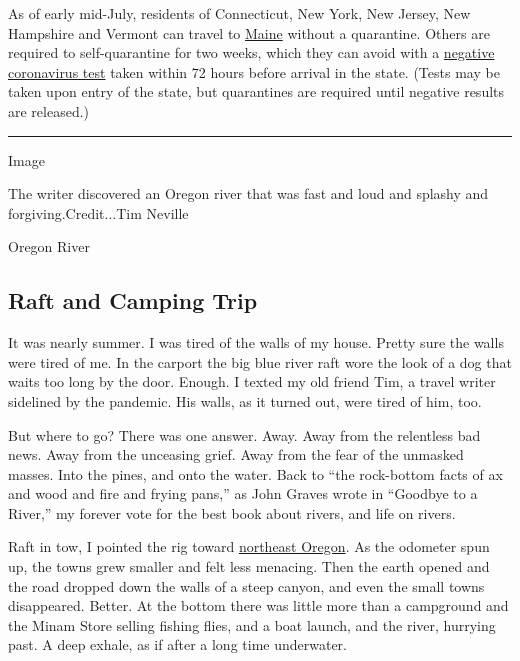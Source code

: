 As of early mid-July, residents of Connecticut, New York, New Jersey,
New Hampshire and Vermont can travel to
\href{https://www.nytimes3xbfgragh.onion/interactive/2020/us/states-reopen-map-coronavirus.html}{Maine}
without a quarantine. Others are required to self-quarantine for two
weeks, which they can avoid with a
\href{https://www.maine.gov/covid19/restartingmaine/keepmainehealthy/faqs}{negative
coronavirus test} taken within 72 hours before arrival in the state.
(Tests may be taken upon entry of the state, but quarantines are
required until negative results are released.)

\begin{center}\rule{0.5\linewidth}{\linethickness}\end{center}

Image

The writer discovered an Oregon river that was fast and loud and splashy
and forgiving.Credit...Tim Neville

Oregon River

\hypertarget{raft-and-camping-trip}{%
\subsection{Raft and Camping Trip}\label{raft-and-camping-trip}}

It was nearly summer. I was tired of the walls of my house. Pretty sure
the walls were tired of me. In the carport the big blue river raft wore
the look of a dog that waits too long by the door. Enough. I texted my
old friend Tim, a travel writer sidelined by the pandemic. His walls, as
it turned out, were tired of him, too.

But where to go? There was one answer. Away. Away from the relentless
bad news. Away from the unceasing grief. Away from the fear of the
unmasked masses. Into the pines, and onto the water. Back to ``the
rock-bottom facts of ax and wood and fire and frying pans,'' as John
Graves wrote in ``Goodbye to a River,'' my forever vote for the best
book about rivers, and life on rivers.

Raft in tow, I pointed the rig toward
\href{http://www.blm.gov/visit/grande-ronde-wild-scenic-river}{northeast
Oregon}. As the odometer spun up, the towns grew smaller and felt less
menacing. Then the earth opened and the road dropped down the walls of a
steep canyon, and even the small towns disappeared. Better. At the
bottom there was little more than a campground and the Minam Store
selling fishing flies, and a boat launch, and the river, hurrying past.
A deep exhale, as if after a long time underwater.

